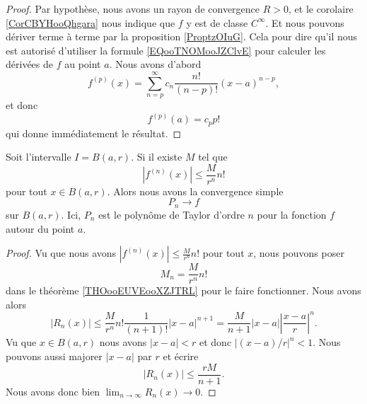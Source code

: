 \begin{proof}
	Par hypothèse, nous avons un rayon de convergence \( R>0\), et le corolaire \ref{CorCBYHooQhgara} nous indique que \( f\) y est de classe \(  C^{\infty}\). Et nous pouvons dériver terme à terme par la proposition \ref{ProptzOIuG}. Cela pour dire qu'il nous est autorisé d'utiliser la formule \eqref{EQooTNOMooJZClvE} pour calculer les dérivées de \( f\) au point \( a\). Nous avons d'abord
	\begin{equation}
		f^{(p)}(x)=\sum_{n=p}^{\infty}c_n\frac{ n! }{ (n-p)! }(x-a)^{n-p},
	\end{equation}
	et donc
	\begin{equation}
		f^{(p)}(a)=c_pp!
	\end{equation}
	qui donne immédiatement le résultat.
\end{proof}

\begin{proposition}
	Soit l'intervalle \( I=B(a,r)\). Si il existe \( M\) tel que
	\begin{equation}
		| f^{(n)}(x) |\leq \frac{ M }{ r^n }n!
	\end{equation}
	pour tout \( x\in B(a,r)\). Alors nous avons la convergence simple
	\begin{equation}
		P_n\to f
	\end{equation}
	sur \( B(a,r)\). Ici, \( P_n\) est le polynôme de Taylor d'ordre \( n\) pour la fonction \( f\) autour du point \( a\).
\end{proposition}

\begin{proof}
	Vu que nous avons \( | f^{(n)}(x) |\leq \frac{ M }{ r^n }n!\) pour tout \( x\), nous pouvons poser
	\begin{equation}
		M_n=\frac{ M }{ r^n }n!
	\end{equation}
	dans le théorème \ref{THOooEUVEooXZJTRL} pour le faire fonctionner. Nous avons alors
	\begin{equation}
		| R_n(x) |\leq \frac{ M }{ r^n }n!\frac{1}{ (n+1)! }| x-a |^{n+1}=\frac{ M }{ n+1 }| x-a |\left| \frac{ x-a }{ r } \right|^n.
	\end{equation}
	Vu que \( x\in B(a,r)\) nous avons \( | x-a |<r\) et donc \( |(x-a)/r |^n<1\). Nous pouvons aussi majorer \( | x-a |\) par \( r\) et écrire
	\begin{equation}
		| R_n(x) |\leq \frac{ rM }{ n+1 }.
	\end{equation}
	Nous avons donc bien \( \lim_{n\to \infty} R_n(x)\to 0\).
\end{proof}


